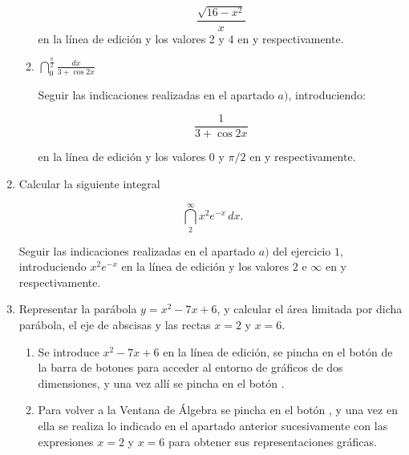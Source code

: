 \begin{enumerate}[leftmargin=*]
\begin{enumerate}
\begin{indicacion}
{\[
\frac{\sqrt{16-x^{2}}}{x}
\]
en la línea de edición y los valores 2 y 4 en  y  respectivamente.}
\end{indicacion}



\item $ \dint^{\frac{\pi}{2}}_{0}{\frac{dx}{3+\cos{2x}}}$

\begin{indicacion}
{Seguir las indicaciones realizadas en el apartado $a)$,
introduciendo:

\[
\frac{1}{3+\cos{2x}}
\]

en la línea de edición y los valores 0 y $\pi/2$ en  y  respectivamente.}
\end{indicacion}


\end{enumerate}



\item Calcular la siguiente integral

\[
\  \dint_{2}^{\infty}{x^{2}e^{-x}\,dx}.
\]

\begin{indicacion}
{Seguir las indicaciones realizadas en el apartado $a)$ del
ejercicio $1$, introduciendo $x^{2}e^{-x}$ en la línea de edición y
los valores $2$ e ${\infty}$ en 
 y  respectivamente.}
\end{indicacion}


\item Representar la parábola $y=x^{2}-7x+6$, y calcular el área
limitada por dicha parábola, el eje de abscisas y las rectas $x=2$ y
$x=6$.


\begin{indicacion}
{
\begin{enumerate}

\item Se introduce $x^{2}-7x+6$ en la línea de edición, se pincha en el botón  de la barra de botones para acceder al entorno de
gráficos de dos dimensiones, y una vez allí se pincha en el botón
.

\item Para volver a la Ventana de Álgebra se pincha en el botón
, y una vez en ella se realiza
lo indicado en el apartado anterior sucesivamente con las
expresiones $x=2$ y $x=6$ para obtener sus representaciones
gráficas.


\end{enumerate}}
\end{indicacion}
\end{enumerate}
